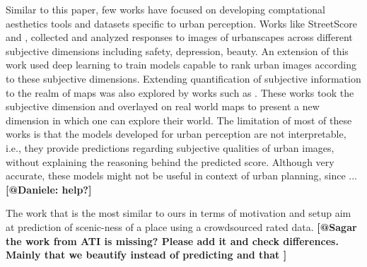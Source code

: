 \par
Similar to this paper, few works have focused on developing comptational aesthetics tools and datasets specific to urban perception. Works like StreetScore \cite{naik2014streetscore} and  \cite{salesses2013collaborative}, collected and analyzed responses to  images of urbanscapes across different subjective dimensions including safety, depression, beauty. An extension of this work  \cite{dubey2016deep} used deep learning  to train models capable to rank urban images according to these subjective dimensions. Extending quantification of subjective information to the realm of maps was also explored by works such as \cite{quercia2014shortest,quercia2015chatty,quercia2015smelly,aiello2016chatty}. These works took the subjective dimension and overlayed on real world maps to present a new dimension in which one can explore their world. The limitation of most of these works is that the models developed for urban perception are not interpretable, i.e., they provide predictions regarding subjective qualities of urban images, without explaining the reasoning behind the predicted score. Although very accurate, these models might not be useful in context of urban planning, since ... \textbf{[@Daniele: help?]}

The work that is the most similar to ours in terms of motivation and setup \cite{seresinhe2017using,workman2016} aim at prediction of scenic-ness of a place using a crowdsourced rated data.
\textbf{[@Sagar the work from ATI is missing? Please add it and check differences. Mainly that we beautify instead of predicting and that ]}



